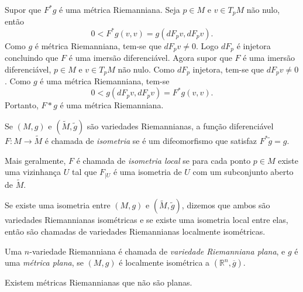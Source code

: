 \begin{demonstracao}
	Supor que $F^*g$ é uma métrica Riemanniana. Seja $p \in M$ e $v \in T_pM$ não nulo, então
	\begin{equation*}
		0 < F^*g(v,v) = g(dF_p v, dF_p v).
	\end{equation*}
	Como $g$ é métrica Riemanniana, tem-se que $dF_p v \neq 0$. Logo $dF_p$ é injetora concluindo que $F$ é uma imersão diferenciável.
	Agora supor que $F$ é uma imersão diferenciável, $p \in M$ e $v \in T_pM$ não nulo. Como $dF_p$ injetora, tem-se que $dF_p v \neq 0$. Como $g$ é uma métrica Riemanniana, tem-se
	\begin{equation*}
		0 < g(dF_p v, dF_p v) = F^*g(v,v).
	\end{equation*}
	Portanto, $F* g$ é uma métrica Riemanniana.
\end{demonstracao}

\begin{definicao}
	Se $(M,g)$ e $(\tilde{M}, \tilde{g})$ são variedades Riemannianas, a função diferenciável $F: M \rightarrow \tilde{M}$ é chamada de \emph{isometria} se é um difeomorfismo que satisfaz $F^* \tilde{g} = g$.
\end{definicao}

\begin{observacao}
	Mais geralmente, $F$ é chamada de \emph{isometria local} se para cada ponto $p \in M$ existe uma vizinhança $U$ tal que $F_{|U}$ é uma isometria de $U$ com um subconjunto aberto de $\tilde{M}$.
\end{observacao}

\begin{observacao}
	Se existe uma isometria entre $(M,g)$ e $(\tilde{M}, \tilde{g})$, dizemos que ambos são variedades Riemannianas isométricas e se existe uma isometria local entre elas, então são chamadas de variedades Riemannianas localmente isométricas.
\end{observacao}

\begin{definicao}
	Uma $n$-variedade Riemanniana é chamada de \emph{variedade Riemanniana plana}, e $g$ é uma \emph{métrica plana}, se $(M,g)$ é localmente isométrica a $(\mathbb{R}^n,\overline{g})$.
\end{definicao}

\begin{observacao}
	Existem métricas Riemannianas que não são planas.
\end{observacao}



